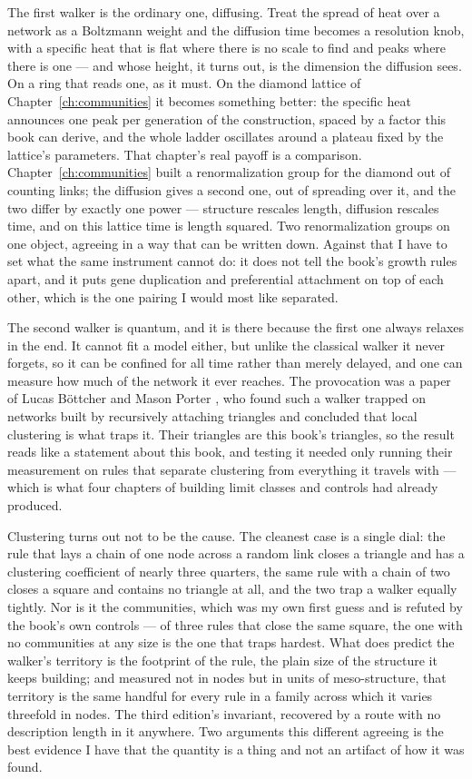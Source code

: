\documentclass[10pt]{book}
\begin{document}
The first walker is the ordinary one, diffusing. Treat the spread of heat over a
network as a Boltzmann weight and the diffusion time becomes a resolution knob, with
a specific heat that is flat where there is no scale to find and peaks where there is
one --- and whose height, it turns out, is the dimension the diffusion sees. On a
ring that reads one, as it must. On the diamond lattice of Chapter~\ref{ch:communities}
it becomes something better: the specific heat announces one peak per generation of
the construction, spaced by a factor this book can derive, and the whole ladder
oscillates around a plateau fixed by the lattice's parameters. That chapter's real
payoff is a comparison. Chapter~\ref{ch:communities} built a renormalization group
for the diamond out of counting links; the diffusion gives a second one, out of
spreading over it, and the two differ by exactly one power --- structure rescales
length, diffusion rescales time, and on this lattice time is length squared. Two
renormalization groups on one object, agreeing in a way that can be written down.
Against that I have to set what the same instrument cannot do: it does not tell the
book's growth rules apart, and it puts gene duplication and preferential attachment
on top of each other, which is the one pairing I would most like separated.

The second walker is quantum, and it is there because the first one always relaxes in
the end. It cannot fit a model either, but unlike the classical walker it never
forgets, so it can be confined for all time rather than merely delayed, and one can
measure how much of the network it ever reaches. The provocation was a paper of Lucas B\"ottcher and Mason
Porter \citeyearpar{boettcher2025localization}, who found such a walker trapped on
networks built by recursively attaching triangles and concluded that local clustering
is what traps it. Their triangles are this book's
triangles, so the result reads like a statement about this book, and testing it needed
only running their measurement on rules that separate clustering from everything it
travels with --- which is what four chapters of building limit classes and controls had
already produced.

Clustering turns out not to be the cause. The cleanest case is a single dial: the rule
that lays a chain of one node across a random link closes a triangle and has a
clustering coefficient of nearly three quarters, the same rule with a chain of two
closes a square and contains no triangle at all, and the two trap a walker equally
tightly. Nor is it the communities, which was my own first guess and is refuted by the
book's own controls --- of three rules that close the same square, the one with no
communities at any size is the one that traps hardest. What does predict the walker's
territory is the footprint of the rule, the plain size of the structure it keeps
building; and measured not in nodes but in units of meso-structure, that territory is
the same handful for every rule in a family across which it varies threefold in nodes.
The third edition's invariant, recovered by a route with no description length in it
anywhere. Two arguments this different agreeing is the best evidence I have that the
quantity is a thing and not an artifact of how it was found.
\end{document}
